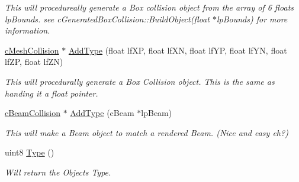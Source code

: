 \begin{DoxyCompactItemize}
\begin{DoxyCompactList}\small\item\em This will procedureally generate a Box collision object from the array of 6 floats lpBounds. see cGeneratedBoxCollision::BuildObject(float $\ast$lpBounds) for more information. \end{DoxyCompactList}\item 
\hypertarget{classc_compound_collision_a094a1e2b828fc8bd1ce0e5ab903125d6}{
\hyperlink{classc_mesh_collision}{cMeshCollision} $\ast$ \hyperlink{classc_compound_collision_a094a1e2b828fc8bd1ce0e5ab903125d6}{AddType} (float lfXP, float lfXN, float lfYP, float lfYN, float lfZP, float lfZN)}
\label{classc_compound_collision_a094a1e2b828fc8bd1ce0e5ab903125d6}

\begin{DoxyCompactList}\small\item\em This will procedurally generate a Box Collision object. This is the same as handing it a float pointer. \end{DoxyCompactList}\item 
\hypertarget{classc_compound_collision_aef4f09716b0038eb50a446f759326084}{
\hyperlink{classc_beam_collision}{cBeamCollision} $\ast$ \hyperlink{classc_compound_collision_aef4f09716b0038eb50a446f759326084}{AddType} (cBeam $\ast$lpBeam)}
\label{classc_compound_collision_aef4f09716b0038eb50a446f759326084}

\begin{DoxyCompactList}\small\item\em This will make a Beam object to match a rendered Beam. (Nice and easy eh?) \end{DoxyCompactList}\item 
\hypertarget{classc_compound_collision_ad96f10a72496cb8879cf7b82d5403f81}{
uint8 \hyperlink{classc_compound_collision_ad96f10a72496cb8879cf7b82d5403f81}{Type} ()}
\label{classc_compound_collision_ad96f10a72496cb8879cf7b82d5403f81}

\begin{DoxyCompactList}\small\item\em Will return the Objects Type. \end{DoxyCompactList}\end{DoxyCompactItemize}


